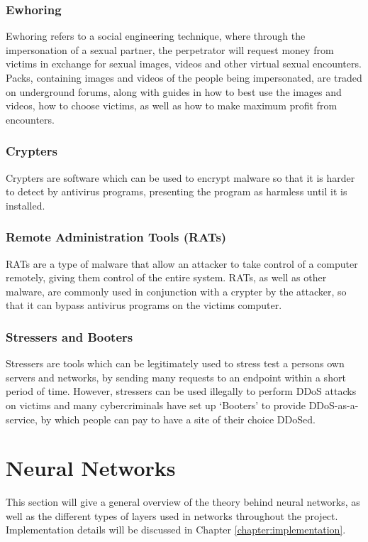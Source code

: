 \documentclass[12pt,a4paper,twoside,openright]{report}
\begin{document}
\subsubsection{Ewhoring}
Ewhoring \cite{ewhoring} refers to a social engineering technique, where through the impersonation of a sexual partner, the perpetrator will request money from victims in exchange for sexual images, videos and other virtual sexual encounters. Packs, containing images and videos of the people being impersonated, are traded on underground forums, along with guides in how to best use the images and videos, how to choose victims, as well as how to make maximum profit from encounters. 

\subsubsection{Crypters}
Crypters are software which can be used to encrypt malware so that it is harder to detect by antivirus programs, presenting the program as harmless until it is installed.

\subsubsection{Remote Administration Tools (RATs)}
RATs are a type of malware that allow an attacker to take control of a computer remotely, giving them control of the entire system. RATs, as well as other malware, are commonly used in conjunction with a crypter by the attacker, so that it can bypass antivirus programs on the victims computer. 

\subsubsection{Stressers and Booters}
Stressers are tools which can be legitimately used to stress test a persons own servers and networks, by sending many requests to an endpoint within a short period of time. However, stressers can be used illegally to perform DDoS attacks on victims and many cybercriminals have set up `Booters' to provide DDoS-as-a-service, by which people can pay to have a site of their choice DDoSed.


\section{Neural Networks}
This section will give a general overview of the theory behind neural networks, as well as the different types of layers used in networks throughout the project. Implementation details will be discussed in Chapter \ref{chapter:implementation}.
\end{document}
